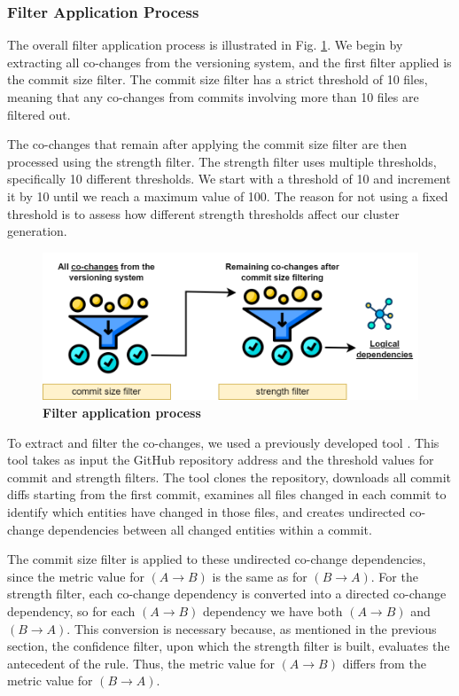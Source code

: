 \documentclass{ieeeaccess}
\begin{document}
\subsubsection{Filter Application Process}

The overall filter application process is illustrated in Fig. \ref{fig:filtering}.  We begin by extracting all co-changes from the versioning system, and the first filter applied is the commit size filter. The commit size filter has a strict threshold of 10 files, meaning that any co-changes from commits involving more than 10 files are filtered out.

The co-changes that remain after applying the commit size filter are then processed using the strength filter. The strength filter uses multiple thresholds, specifically 10 different thresholds. We start with a threshold of 10 and increment it by 10 until we reach a maximum value of 100. The reason for not using a fixed threshold is to assess how different strength thresholds affect our cluster generation. 

\begin{figure}[t!]
  \centering
  \includegraphics[width=\columnwidth]{filtering.png}
  \caption{ \textbf{Filter application process}}
  \label{fig:filtering}
\end{figure}

To extract and filter the co-changes, we used a previously developed tool \cite{b4}. This tool takes as input the GitHub repository address and the threshold values for commit and strength filters. The tool clones the repository, downloads all commit diffs starting from the first commit, examines all files changed in each commit to identify which entities have changed in those files, and creates undirected co-change dependencies between all changed entities within a commit.

The commit size filter is applied to these undirected co-change dependencies, since the metric value for $(A \rightarrow B)$ is the same as for $(B \rightarrow A)$. For the strength filter, each co-change dependency is converted into a directed co-change dependency, so for each $(A \rightarrow B)$ dependency we have both $(A \rightarrow B)$ and $(B \rightarrow A)$. This conversion is necessary because, as mentioned in the previous section, the confidence filter, upon which the strength filter is built, evaluates the antecedent of the rule. Thus, the metric value for $(A \rightarrow B)$ differs from the metric value for $(B \rightarrow A)$.
\end{document}
